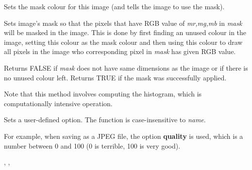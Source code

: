 Sets the mask colour for this image (and tells the image to use the mask).

\label{wximagesetmaskfromimage}





Sets image's mask so that the pixels that have RGB value of {\it mr,mg,mb}
in {\it mask} will be masked in the image. This is done by first finding an
unused colour in the image, setting this colour as the mask colour and then
using this colour to draw all pixels in the image who corresponding pixel 
in {\it mask} has given RGB value.


Returns FALSE if {\it mask} does not have same dimensions as the image or if
there is no unused colour left. Returns TRUE if the mask was successfully 
applied.


Note that this method involves computing the histogram, which is
computationally intensive operation.

\label{wximagesetoption}



Sets a user-defined option. The function is case-insensitive to {\it name}.

For example, when saving as a JPEG file, the option {\bf quality} is
used, which is a number between 0 and 100 (0 is terrible, 100 is very good).


,\rtfsp
{},\rtfsp
{}

\label{wximagesetpalette}

